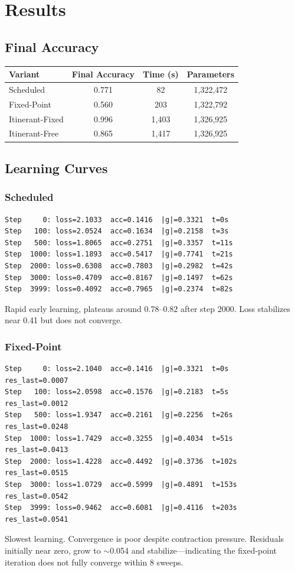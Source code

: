 \documentclass[11pt]{article}
\begin{document}
\section{Results}

\subsection{Final Accuracy}

\begin{table}[H]
\centering
\begin{tabular}{lccc}
\toprule
\textbf{Variant} & \textbf{Final Accuracy} & \textbf{Time (s)} & \textbf{Parameters} \\
\midrule
Scheduled & 0.771 & 82 & 1,322,472 \\
Fixed-Point & 0.560 & 203 & 1,322,792 \\
Itinerant-Fixed & 0.996 & 1,403 & 1,326,925 \\
Itinerant-Free & 0.865 & 1,417 & 1,326,925 \\
\bottomrule
\end{tabular}
\end{table}

\subsection{Learning Curves}

\subsubsection*{Scheduled}
\begin{lstlisting}
Step     0: loss=2.1033  acc=0.1416  |g|=0.3321  t=0s
Step   100: loss=2.0524  acc=0.1634  |g|=0.2158  t=3s
Step   500: loss=1.8065  acc=0.2751  |g|=0.3357  t=11s
Step  1000: loss=1.1893  acc=0.5417  |g|=0.7741  t=21s
Step  2000: loss=0.6308  acc=0.7803  |g|=0.2982  t=42s
Step  3000: loss=0.4709  acc=0.8167  |g|=0.1497  t=62s
Step  3999: loss=0.4092  acc=0.7965  |g|=0.2374  t=82s
\end{lstlisting}
Rapid early learning, plateaus around 0.78--0.82 after step 2000. Loss stabilizes near 0.41 but does not converge.

\subsubsection*{Fixed-Point}
\begin{lstlisting}
Step     0: loss=2.1040  acc=0.1416  |g|=0.3321  t=0s   res_last=0.0007
Step   100: loss=2.0598  acc=0.1576  |g|=0.2183  t=5s   res_last=0.0012
Step   500: loss=1.9347  acc=0.2161  |g|=0.2256  t=26s  res_last=0.0248
Step  1000: loss=1.7429  acc=0.3255  |g|=0.4034  t=51s  res_last=0.0413
Step  2000: loss=1.4228  acc=0.4492  |g|=0.3736  t=102s res_last=0.0515
Step  3000: loss=1.0729  acc=0.5999  |g|=0.4891  t=153s res_last=0.0542
Step  3999: loss=0.9462  acc=0.6081  |g|=0.4116  t=203s res_last=0.0541
\end{lstlisting}
Slowest learning. Convergence is poor despite contraction pressure. Residuals initially near zero, grow to $\sim$0.054 and stabilize---indicating the fixed-point iteration does not fully converge within 8 sweeps.
\end{document}
